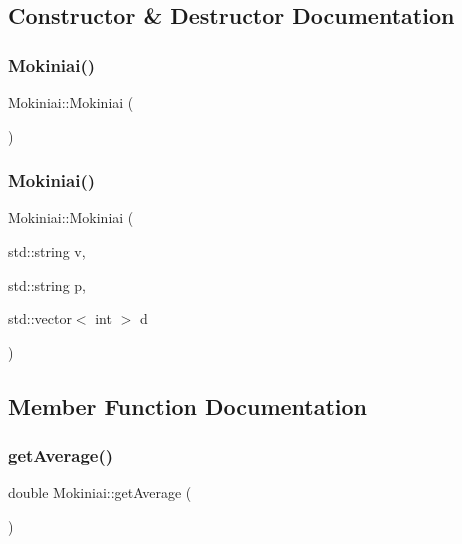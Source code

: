 \subsection{Constructor \& Destructor Documentation}
\mbox{\label{class_mokiniai_a3d178ed1b403c8c2c016cad13fee7831}} 
\subsubsection{\texorpdfstring{Mokiniai()}{Mokiniai()}\hspace{0.1cm}{\footnotesize\ttfamily [1/2]}}
{\footnotesize\ttfamily Mokiniai\+::\+Mokiniai (\begin{DoxyParamCaption}{ }\end{DoxyParamCaption})\hspace{0.3cm}{\ttfamily [inline]}}

\mbox{\label{class_mokiniai_afe96df1e40d31c353e229ec69b56063a}} 
\subsubsection{\texorpdfstring{Mokiniai()}{Mokiniai()}\hspace{0.1cm}{\footnotesize\ttfamily [2/2]}}
{\footnotesize\ttfamily Mokiniai\+::\+Mokiniai (\begin{DoxyParamCaption}\item[{std\+::string}]{v,  }\item[{std\+::string}]{p,  }\item[{std\+::vector$<$ int $>$}]{d }\end{DoxyParamCaption})\hspace{0.3cm}{\ttfamily [inline]}}



\subsection{Member Function Documentation}
\mbox{\label{class_mokiniai_a4fbaa66eb59819ec942e2443a69fed4b}} 
\subsubsection{\texorpdfstring{get\+Average()}{getAverage()}}
{\footnotesize\ttfamily double Mokiniai\+::get\+Average (\begin{DoxyParamCaption}{ }\end{DoxyParamCaption})\hspace{0.3cm}{\ttfamily [inline]}}


